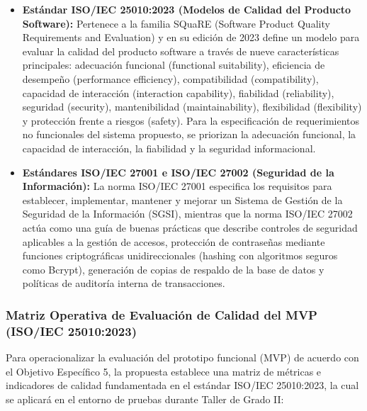 \begin{itemize}
    \item \textbf{Estándar ISO/IEC 25010:2023 (Modelos de Calidad del Producto Software):} Pertenece a la familia SQuaRE (Software Product Quality Requirements and Evaluation) y en su edición de 2023 define un modelo para evaluar la calidad del producto software a través de nueve características principales: adecuación funcional (functional suitability), eficiencia de desempeño (performance efficiency), compatibilidad (compatibility), capacidad de interacción (interaction capability), fiabilidad (reliability), seguridad (security), mantenibilidad (maintainability), flexibilidad (flexibility) y protección frente a riesgos (safety). Para la especificación de requerimientos no funcionales del sistema propuesto, se priorizan la adecuación funcional, la capacidad de interacción, la fiabilidad y la seguridad informacional.
    \item \textbf{Estándares ISO/IEC 27001 e ISO/IEC 27002 (Seguridad de la Información):} La norma ISO/IEC 27001 especifica los requisitos para establecer, implementar, mantener y mejorar un Sistema de Gestión de la Seguridad de la Información (SGSI), mientras que la norma ISO/IEC 27002 actúa como una guía de buenas prácticas que describe controles de seguridad aplicables a la gestión de accesos, protección de contraseñas mediante funciones criptográficas unidireccionales (hashing con algoritmos seguros como Bcrypt), generación de copias de respaldo de la base de datos y políticas de auditoría interna de transacciones.
\end{itemize}

\subsubsection{Matriz Operativa de Evaluación de Calidad del MVP (ISO/IEC 25010:2023)}

Para operacionalizar la evaluación del prototipo funcional (MVP) de acuerdo con el Objetivo Específico 5, la propuesta establece una matriz de métricas e indicadores de calidad fundamentada en el estándar ISO/IEC 25010:2023, la cual se aplicará en el entorno de pruebas durante Taller de Grado II:

